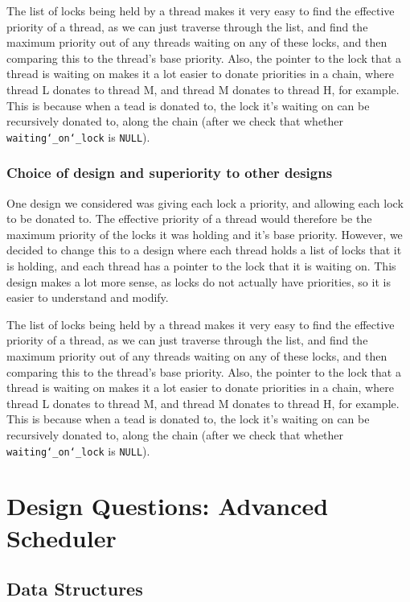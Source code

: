 \documentclass{article}
\renewcommand{\_}{\char`_}
\begin{document}
The list of locks being held by a thread makes it very easy to find the effective priority of a thread, as we can just traverse through the list, and find the maximum priority out of any threads waiting on any of these locks, and then comparing this to the thread's base priority. Also, the pointer to the lock that a thread is waiting on makes it a lot easier to donate priorities in a chain, where thread L donates to thread M, and thread M donates to thread H, for example. This is because when a tead is donated to, the lock it's waiting on can be recursively donated to, along the chain (after we check that whether \texttt{waiting\_on\_lock} is \texttt{NULL}).

\subsubsection{Choice of design and superiority to other designs}

One design we considered was giving each lock a priority, and allowing each lock to be donated to. The effective priority of a thread would therefore be the maximum priority of the locks it was holding and it's base priority. However, we decided to change this to a design where each thread holds a list of locks that it is holding, and each thread has a pointer to the lock that it is waiting on. This design makes a lot more sense, as locks do not actually have priorities, so it is easier to understand and modify. 

The list of locks being held by a thread makes it very easy to find the effective priority of a thread, as we can just traverse through the list, and find the maximum priority out of any threads waiting on any of these locks, and then comparing this to the thread's base priority. Also, the pointer to the lock that a thread is waiting on makes it a lot easier to donate priorities in a chain, where thread L donates to thread M, and thread M donates to thread H, for example. This is because when a tead is donated to, the lock it's waiting on can be recursively donated to, along the chain (after we check that whether \texttt{waiting\_on\_lock} is \texttt{NULL}).

\newpage

\section{Design Questions: Advanced Scheduler}
\subsection{Data Structures}
\end{document}
